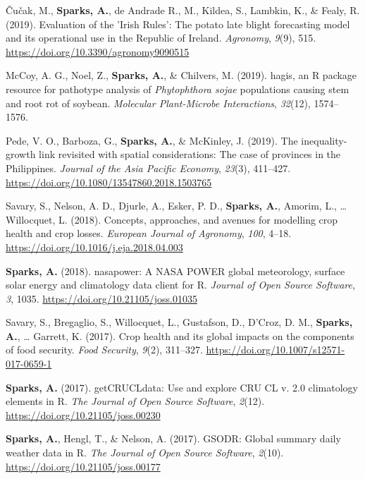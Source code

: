 \documentclass[11pt, a4paper]{awesome-cv}
\begin{document}
\leavevmode\hypertarget{ref-cucak2019evaluation}{}%
Čučak, M., \textbf{Sparks, A.}, de Andrade R., M., Kildea, S., Lambkin,
K., \& Fealy, R. (2019). Evaluation of the {{'}Irish Rules{'}}: The
potato late blight forecasting model and its operational use in the
{Republic of Ireland}. \emph{Agronomy}, \emph{9}(9), 515.
\url{https://doi.org/10.3390/agronomy9090515}

\leavevmode\hypertarget{ref-McCoy2019}{}%
McCoy, A. G., Noel, Z., \textbf{Sparks, A.}, \& Chilvers, M. (2019).
{hagis}, an {R} package resource for pathotype analysis of
\emph{{Phytophthora} sojae} populations causing stem and root rot of
soybean. \emph{Molecular Plant-Microbe Interactions}, \emph{32}(12),
1574--1576.

\leavevmode\hypertarget{ref-Pede2019}{}%
Pede, V. O., Barboza, G., \textbf{Sparks, A.}, \& McKinley, J. (2019).
The inequality-growth link revisited with spatial considerations: The
case of provinces in the {Philippines}. \emph{Journal of the Asia
Pacific Economy}, \emph{23}(3), 411--427.
\url{https://doi.org/10.1080/13547860.2018.1503765}

\leavevmode\hypertarget{ref-Savary2018}{}%
Savary, S., Nelson, A. D., Djurle, A., Esker, P. D.,
\textbf{Sparks, A.}, Amorim, L., \ldots{} Willocquet, L. (2018).
Concepts, approaches, and avenues for modelling crop health and crop
losses. \emph{European Journal of Agronomy}, \emph{100}, 4--18.
\url{https://doi.org/10.1016/j.eja.2018.04.003}

\leavevmode\hypertarget{ref-Sparks2018}{}%
\textbf{Sparks, A.} (2018). {nasapower}: {A NASA POWER} global
meteorology, surface solar energy and climatology data client for {R}.
\emph{Journal of Open Source Software}, \emph{3}, 1035.
\url{https://doi.org/10.21105/joss.01035}

\leavevmode\hypertarget{ref-Savary2017}{}%
Savary, S., Bregaglio, S., Willocquet, L., Gustafson, D., D'Croz, D. M.,
\textbf{Sparks, A.}, \ldots{} Garrett, K. (2017). Crop health and its
global impacts on the components of food security. \emph{Food Security},
\emph{9}(2), 311--327. \url{https://doi.org/10.1007/s12571-017-0659-1}

\leavevmode\hypertarget{ref-Sparks2017c}{}%
\textbf{Sparks, A.} (2017). {getCRUCLdata}: {Use} and explore {CRU CL}
v. 2.0 climatology elements in {R}. \emph{The Journal of Open Source
Software}, \emph{2}(12). \url{https://doi.org/10.21105/joss.00230}

\leavevmode\hypertarget{ref-Sparks2017}{}%
\textbf{Sparks, A.}, Hengl, T., \& Nelson, A. (2017). {GSODR}: {Global}
summary daily weather data in {R}. \emph{The Journal of Open Source
Software}, \emph{2}(10). \url{https://doi.org/10.21105/joss.00177}
\end{document}
